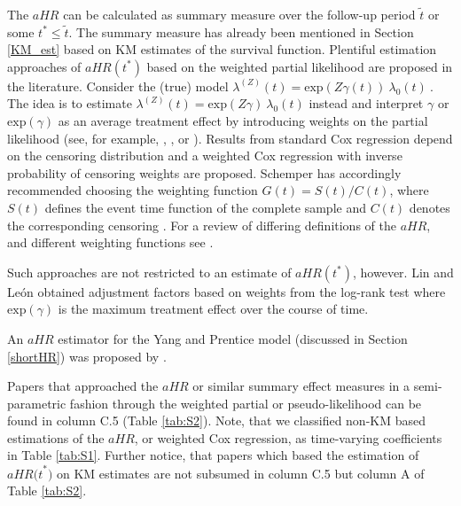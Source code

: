 \noindent The $aHR$ can be calculated as summary measure over the follow-up period $\tilde{t}$ or some  $t^*\le \tilde{t}$. The summary measure has already been mentioned in Section \ref{KM_est} based on KM estimates of the survival function. Plentiful estimation approaches of $aHR(t^*)$ based on the weighted partial likelihood are proposed in the literature. Consider the (true) model ${\lambda }^{\left(Z\right)}\left(t\right)={\mathrm{exp} \left(Z\gamma \left(t\right)\right)\ {\lambda }_0(t)\ }$. The idea is to estimate ${\lambda }^{\left(Z\right)}\left(t\right)={\mathrm{exp} \left(Z\gamma \right)\ }{\lambda }_0(t)$ instead and interpret $\gamma $ or $\mathrm{exp}\mathrm{}(\gamma )$ as an average treatment effect by introducing weights on the partial likelihood (see, for example, \cite{Boyd.2012}, \cite{Hattori.2012}, or \cite{Schemper.2009}). Results from standard Cox regression depend on the censoring distribution and a weighted Cox regression with inverse probability of censoring weights are proposed. Schemper \cite{Schemper.2009} has accordingly recommended choosing the weighting function $G\left(t\right)=S(t)/C(t)$, where $S(t)$ defines the event time  function of the complete sample and $C(t)$ denotes the corresponding censoring . For a review of differing definitions of the $aHR$, and different weighting functions  see \cite{Schemper.2009}. 

\noindent 

\noindent Such approaches are not restricted to an estimate of $aHR(t^*)$, however. Lin and Le\'on \cite{Lin.2017} obtained adjustment factors based on weights from the log-rank test where $\mathrm{exp}(\gamma)$ is the maximum treatment effect over the course of time. 

\noindent 

\noindent An $aHR$ estimator for the Yang and Prentice model (discussed in Section \ref{shortHR}) was proposed by \cite{Yang.2011}.

\noindent 

\noindent Papers that approached the $aHR$ or similar summary effect measures in a semi-parametric fashion through the weighted partial or pseudo-likelihood can be found in column C.5 (Table \ref{tab:S2}). Note, that we classified non-KM based estimations of the $aHR$, or weighted Cox regression, as time-varying coefficients in Table \ref{tab:S1}. Further notice, that papers which based the estimation of ${aHR(t}^*)$ on KM estimates are not subsumed in column C.5 but column A of Table \ref{tab:S2}.

